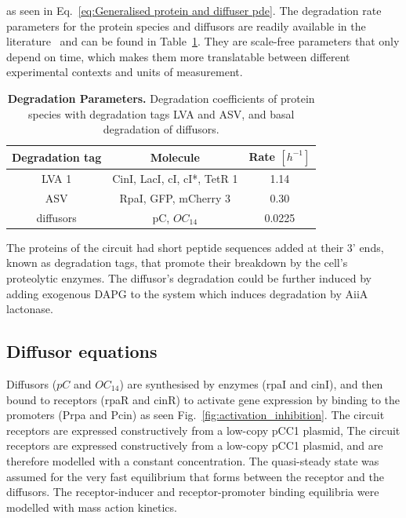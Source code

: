 as seen in Eq.~\ref{eq:Generalised protein and diffuser pde}.
The degradation rate parameters for the protein species and diffusors are readily available in the literature~\parencite{Andersen1998, kaufmann2005revisiting}
and can be found in Table~\ref{table:degradation table}.
They are scale-free parameters that only depend on time,
which makes them more translatable between different experimental contexts and units of measurement.



\begin{table}[H]
    \centering
    \begin{tabular}{|c|c|c|}
        \hline
        \textbf{Degradation tag} & \textbf{Molecule} & \textbf{Rate $[h^{-1}]$} \\
        \hline
        LVA 1 & CinI, LacI, cI, cI*, TetR 1 & 1.14 \\
        \hline
        ASV & RpaI, GFP, mCherry 3 & 0.30 \\
        \hline
        diffusors & pC, $OC_{14}$ & 0.0225 \\
        \hline
    \end{tabular}
    \caption{\textbf{Degradation Parameters.} Degradation coefficients of protein species with degradation tags LVA and ASV, and basal degradation of diffusors.}
    \label{table:degradation table}
\end{table}

The proteins of the circuit had short peptide sequences added at their 3’ ends,
known as degradation tags, that promote their breakdown by the cell’s proteolytic enzymes.
The diffusor's degradation could be further induced
by adding exogenous DAPG to the system which induces degradation by AiiA lactonase.

\subsection{Diffusor equations}
Diffusors ($pC$ and $OC_{14}$) are synthesised by enzymes (rpaI and cinI), and then bound to receptors (rpaR and cinR) to activate gene expression by binding to the promoters (Prpa and Pcin)
 as seen Fig.~\ref{fig:activation_inhibition}.
The circuit receptors are expressed constructively from a low-copy pCC1 plasmid,
The circuit receptors are expressed constructively from a low-copy pCC1 plasmid,
and are therefore modelled with a constant concentration.
The quasi-steady state was assumed for the very fast equilibrium that forms between the receptor and the diffusors.
The receptor-inducer and receptor-promoter binding equilibria were modelled with mass action kinetics.

